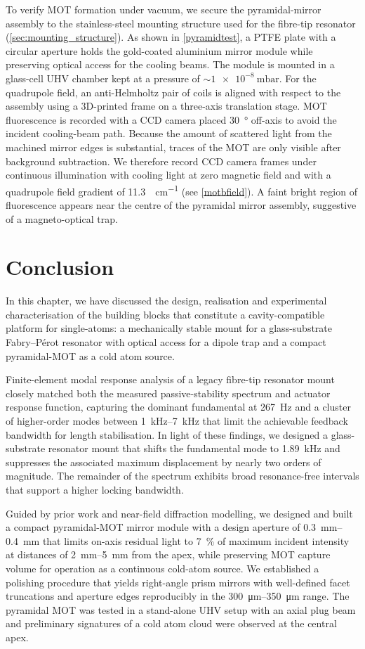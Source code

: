 \documentclass[../Thesis-IJspeert.tex]{subfiles}
\begin{document}
To verify MOT formation under vacuum, we secure the pyramidal-mirror assembly to the stainless-steel mounting structure used for the fibre-tip resonator (\autoref{sec:mounting_structure}). As shown in \autoref{pyramidtest}, a PTFE plate with a circular aperture holds the gold-coated aluminium mirror module while preserving optical access for the cooling beams. The module is mounted in a glass-cell UHV chamber kept at a pressure of $\sim\SI{1e-8}{\milli\bar}$. For the quadrupole field, an anti-Helmholtz pair of coils is aligned with respect to the assembly using a 3D-printed frame on a three-axis translation stage. MOT fluorescence is recorded with a CCD camera placed \SI{30}{\degree} off-axis to avoid the incident cooling-beam path. Because the amount of scattered light from the machined mirror edges is substantial, traces of the MOT are only visible after background subtraction. We therefore record CCD camera frames under continuous illumination with cooling light at zero magnetic field and with a quadrupole field gradient of \SI{11.3}{\gauss\per\centi\meter} (see \autoref{motbfield}). A faint bright region of fluorescence appears near the centre of the pyramidal mirror assembly, suggestive of a magneto-optical trap.

\section{Conclusion}
In this chapter, we have discussed the design, realisation and experimental characterisation of the building blocks that constitute a cavity-compatible platform for single-atoms: a mechanically stable mount for a glass-substrate Fabry--Pérot resonator with optical access for a dipole trap and a compact pyramidal-MOT as a cold atom source.

Finite-element modal response analysis of a legacy fibre-tip resonator mount closely matched both the measured passive-stability spectrum and actuator response function, capturing the dominant fundamental at \SI{267}{\hertz} and a cluster of higher-order modes between \SIrange{1}{7}{\kilo\hertz} that limit the achievable feedback bandwidth for length stabilisation. In light of these findings, we designed a glass-substrate resonator mount that shifts the fundamental mode to \SI{1.89}{\kilo\hertz} and suppresses the associated maximum displacement by nearly two orders of magnitude. The remainder of the spectrum exhibits broad resonance-free intervals that support a higher locking bandwidth.

Guided by prior work and near-field diffraction modelling, we designed and built a compact pyramidal-MOT mirror module with a design aperture of \SIrange{0.3}{0.4}{\milli\meter} that limits on-axis residual light to \SI{7}{\percent} of maximum incident intensity at distances of \SIrange{2}{5}{\milli\meter} from the apex, while preserving MOT capture volume for operation as a continuous cold-atom source. We established a polishing procedure that yields right-angle prism mirrors with well-defined facet truncations and aperture edges reproducibly in the \SIrange{300}{350}{\micro\meter} range. The pyramidal MOT was tested in a stand-alone UHV setup with an axial plug beam and preliminary signatures of a cold atom cloud were observed at the central apex.
\end{document}
